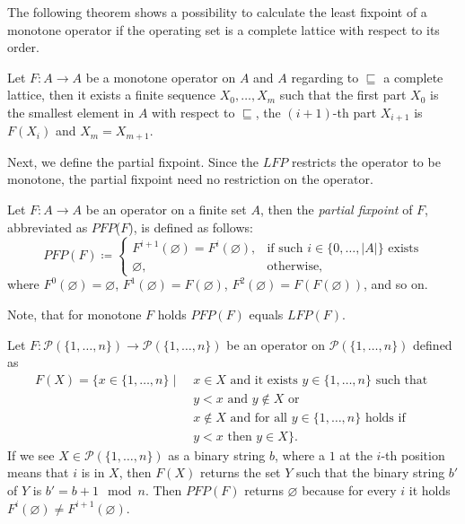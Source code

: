 The following theorem shows a possibility to calculate the least fixpoint of a monotone operator if the operating set is a complete lattice with respect to its order.

\begin{theorem}
\label{theorem:kleene}
Let $F: A \rightarrow A$ be a monotone operator on $A$ and $A$ regarding to $\sqsubseteq$ a complete lattice, then it exists a finite sequence $X_0, \dots, X_m$ such that the first part $X_0$ is the smallest element in $A$ with respect to $\sqsubseteq$, the $(i+1)$-th part $X_{i+1}$ is $F(X_i)$ and $X_m = X_{m+1}$.
\end{theorem}

Next, we define the partial fixpoint. Since the
$\mathit{LFP}$ restricts the operator to be monotone, the partial fixpoint need no restriction on the operator.

\begin{definition}
\label{definition:pfp}
    Let $F\colon A \rightarrow A$ be an operator on a finite set $A$, then the \emph{partial
    fixpoint} of $F$, abbreviated as $\mathit{PFP}$($F$), is defined as follows:
    \[\mathit{PFP}(F)\coloneqq\begin{cases}
               F^{i+1}(\varnothing)=F^i(\varnothing),  & \text{if such } i \in \{0,\dots,|A|\} \text{ exists}\\
               \varnothing, & \text{otherwise,}
    \end{cases}\]
    where $F^0(\varnothing) = \varnothing$, $F^1(\varnothing) = F(\varnothing)$, $F^2(\varnothing) = F(F(\varnothing))$, and so on.
\end{definition}

Note, that for monotone $F$ holds $\mathit{PFP}(F)$ equals $\mathit{LFP}(F)$. 


\begin{example}
\label{example:pfp}
Let $F: \mathcal{P}(\{1, \dots, n\}) \rightarrow  \mathcal{P}(\{1, \dots, n\})$ be an operator on $ \mathcal{P}(\{1, \dots, n\})$ defined as
\begin{align*}
	F(X) = \{x \in \{1, \dots, n\}\mid &\; x\in X \text{ and it exists } y \in \{1, \dots, n\} \text{ such that }\\ &\;y < x \text{ and } y\not\in X \text{ or } \\&\;x\not\in X \text{ and for all } y\in \{1,\dots, n\} \text{ holds if } \\&\;y<x \text{ then } y\in X\}. 
\end{align*}
If we see $X \in \mathcal{P}(\{1,\dots, n\})$ as a binary string $b$, where a $1$ at the $i$-th position means that $i$ is in $X$, then $F(X)$ returns the set $Y$ such that the binary string $b'$ of $Y$ is $b' = b+1\mod n$. Then $PFP(F)$ returns $\varnothing$ because for every $i$ it holds $F^i(\varnothing) \neq F^{i+1}(\varnothing)$.
\end{example}